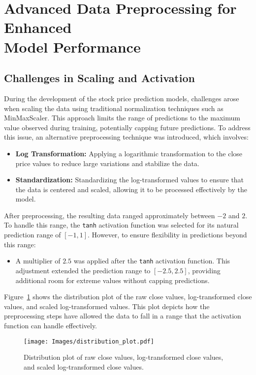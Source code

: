 \section{Advanced Data Preprocessing for Enhanced\\ Model Performance}
\subsection{Challenges in Scaling and Activation}
During the development of the stock price prediction models, challenges arose when scaling the data using traditional normalization techniques such as MinMaxScaler. This approach limits the range of predictions to the maximum value observed during training, potentially capping future predictions. To address this issue, an alternative preprocessing technique was introduced, which involves:
\begin{itemize}
    \item \textbf{Log Transformation:} Applying a logarithmic transformation to the close price values to reduce large variations and stabilize the data.
    \item \textbf{Standardization:} Standardizing the log-transformed values to ensure that the data is centered and scaled, allowing it to be processed effectively by the model.
\end{itemize}

After preprocessing, the resulting data ranged approximately between $-2$ and $2$. To handle this range, the \texttt{tanh} activation function was selected for its natural prediction range of $[-1, 1]$. However, to ensure flexibility in predictions beyond this range:
\begin{itemize}
    \item A multiplier of $2.5$ was applied after the \texttt{tanh} activation function. This adjustment extended the prediction range to $[-2.5, 2.5]$, providing additional room for extreme values without capping predictions.
\end{itemize}

Figure~\ref{fig:distribution_plot} shows the distribution plot of the raw close values, log-transformed close values, and scaled log-transformed values. This plot depicts how the preprocessing steps have allowed the data to fall in a range that the activation function can handle effectively.

\begin{figure}[h]
    \centering
    \texttt{[image: Images/distribution\_plot.pdf]}
    \caption{Distribution plot of raw close values, log-transformed close values, and scaled log-transformed close values.}
    \label{fig:distribution_plot}
\end{figure}

